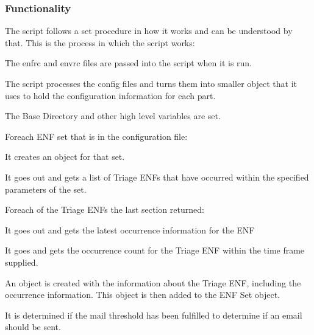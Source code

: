 \documentclass[a4paper,12pt]{report}
\begin{document}
\subsubsection*{Functionality}
 \par
The script follows a set procedure in how it works and can be understood by that. This is the process in which the script works: \par
\begin{myEnumerate}
\item The enfrc and envrc files are passed into the script when it is run. \par
\item The script processes the config files and turns them into smaller object that it uses to hold the configuration information for each part. \par
\item The Base Directory and other high level variables are set. \par
\item Foreach ENF set that is in the configuration file: \par
\begin{myEnumerate}
\item It creates an object for that set. \par
\item It goes out and gets a list of Triage ENFs that have occurred within the specified parameters of the set. \par
\item Foreach of the Triage ENFs the last section returned: \par
\begin{myEnumerate}
\item It goes out and gets the latest occurrence information for the ENF \par
\item It goes and gets the occurrence count for the Triage ENF within the time frame supplied. \par
\item An object is created with the information about the Triage ENF, including the occurrence information. This object is then added to the ENF Set object. \par
\item It is determined if the mail threshold has been fulfilled to determine if an email should be sent. \par
\end{myEnumerate}

\end{myEnumerate}
\end{myEnumerate}
\end{document}
